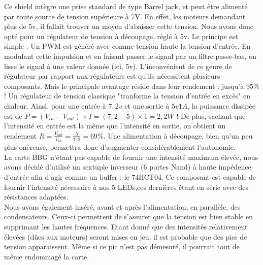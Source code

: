 			Ce shield intègre une prise standard de type Barrel jack, et peut être alimenté par toute source de tension supérieure à 7V. 
			En effet, les moteurs demandant plus de 5v, il fallait trouver un moyen d'abaisser cette tension. Nous avons donc opté pour un régulateur de tension à découpage, réglé à 5v. Le principe est simple : Un PWM est généré avec comme tension haute la tension d'entrée. En modulant cette impulsion et en faisant passer le signal par un filtre passe-bas, on lisse le signal à une valeur donnée (ici, 5v). L'inconvénient de ce genre de régulateur par rapport aux régulateurs est qu'ils nécessitent plusieurs composants. Mais le principale avantage réside dans leur rendement : jusqu'à 95\% \cite{bib25} ! Un régulateur de tension classique "tranforme la tension d'entrée en excès" en chaleur. Ainsi, pour une entrée à $7,2v$ et une sortie à $5v 1A$, la puissance dissipée est de $P = (V_{in} - V_{out}) \times I = (7,2 - 5) \times 1 = 2,2 W$ ! De plus, sachant que l'intensité en entrée est la même que l'intensité en sortie, on obtient un rendement $R = \frac{V_{out}}{V_{in}} = \frac{5}{7,2} = 69\%$. Une alimentation à découpage, bien qu'un peu plus onéreuse, permettra donc d'augmenter considérablement l'autonomie.\\
			La carte BBG n'étant pas capable de fournir une intensité maximum élevée, nous avons décidé d'utilisé un sextuple inverseur (6 portes Nand) à haute impédence d'entrée afin d'agir comme un buffer : le 74HCT04. Ce composant est capable de fournir l'intensité nécessaire à nos 5 LEDs,ces dernières étant en série avec des résistances adaptées.\\  
			Nous avons également inséré, avant et après l'alimentation, en parallèle, des condensateurs. Ceux-ci permettent de s'assurer que la tension est bien stable en supprimant les hautes fréquences. Etant donné que des intensités relativement élevées (dûes aux moteurs) seront mises en jeu, il est probable que des pics de tension apparaissent. Même si ce pic n'est pas démesuré, il pourrait tout de même endommagé la carte.\\

